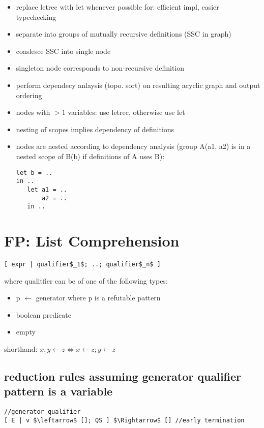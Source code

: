 \documentclass[8pt]{extarticle}
\begin{document}
\begin{multicols*}{2}
  \begin{itemize}
  \item replace letrec with let whenever possible for: efficient impl, easier typechecking
  \item separate into groups of mutually recursive definitions (SSC in graph)
  \item coaslesce SSC into single node
  \item singleton node corresponds to non-recursive definition
  \item perform dependecy anlaysis (topo. sort) on resulting acyclic graph and output ordering
  \item nodes with $>1$ variables: use letrec, otherwise use let
  \item nesting of scopes implies dependency of definitions
  \item nodes are nested according to dependency analysis (group A(a1, a2) is in a nested scope of B(b) if definitions of A uses B):\\
\begin{verbatim}
let b = ..
in ..
   let a1 = ..
       a2 = ..
   in ..
\end{verbatim}
  \end{itemize}

\vfill\null
\columnbreak

\section{FP: List Comprehension}
\begin{lstlisting}
[ expr | qualifier$_1$; ..; qualifier$_n$ ]
\end{lstlisting}
where qualitfier can be of one of the following types:
\begin{itemize}
\item p $\leftarrow$ generator where p is a refutable pattern
\item boolean predicate
\item empty
\end{itemize}

shorthand: $x, y \leftarrow z \iff x \leftarrow z; y \leftarrow z$

\subsection{reduction rules assuming generator qualifier pattern is a variable}
\begin{lstlisting}
//generator qualifier
[ E | v $\leftarrow$ []; QS ] $\Rightarrow$ [] //early termination


\end{lstlisting}
\end{multicols*}
\end{document}
